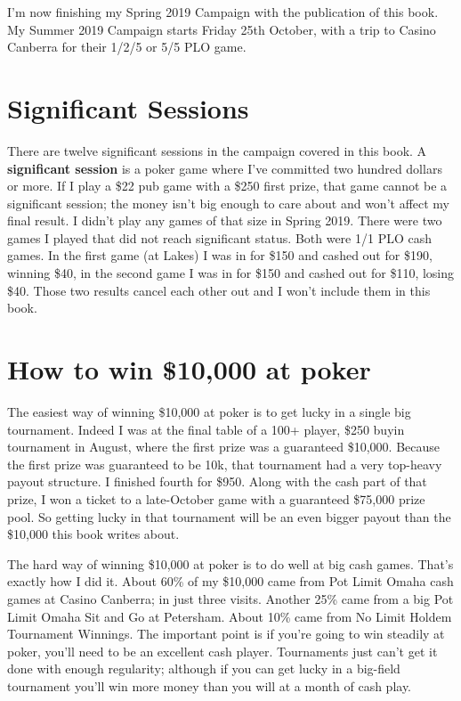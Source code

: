 I'm now finishing my Spring 2019 Campaign with the publication of this
book. My Summer 2019 Campaign starts Friday 25th October, with a trip
to Casino Canberra for their 1/2/5 or 5/5 PLO game.

\section*{Significant Sessions}


There are twelve significant sessions in the campaign covered in this
book. A \textbf{significant session} is a poker game where I've
committed two hundred dollars or more. If I play a \$22 pub game with
a \$250 first prize, that game cannot be a significant session; the
money isn't big enough to care about and won't affect my final
result. I didn't play any games of that size in Spring 2019. There
were two games I played that did not reach significant status. Both
were 1/1 PLO cash games. In the first game (at Lakes) I was in for
\$150 and cashed out for \$190, winning \$40, in the second game I was
in for \$150 and cashed out for \$110, losing \$40. Those two results
cancel each other out and I won't include them in this book.


\section{How to win \$10,000 at poker}

The easiest way of winning \$10,000 at poker is to get lucky in a
single big tournament. Indeed I was at the final table of a 100+
player, \$250 buyin tournament in August, where the first prize was a
guaranteed \$10,000. Because the first prize was guaranteed to be 10k,
that tournament had a very top-heavy payout structure. I finished
fourth for \$950. Along with the cash part of that prize, I won a
ticket to a late-October game with a guaranteed \$75,000 prize
pool. So getting lucky in that tournament will be an even bigger
payout than the \$10,000 this book writes about.

The hard way of winning \$10,000 at poker is to do well at big cash
games. That's exactly how I did it. About 60\% of my \$10,000 came
from Pot Limit Omaha cash games at Casino Canberra; in just three
visits. Another 25\% came from a big Pot Limit Omaha Sit and Go at
Petersham. About 10\% came from No Limit Holdem Tournament
Winnings. The important point is if you're going to win steadily at
poker, you'll need to be an excellent cash player. Tournaments just
can't get it done with enough regularity; although if you can get
lucky in a big-field tournament you'll win more money than you will at
a month of cash play.

